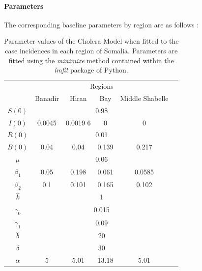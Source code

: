 \documentclass[letter,12pt, usenames,dvipsnames]{article}
\begin{document}
\paragraph{Parameters}
The corresponding baseline parameters by region are as follows :

\begin{table}[h!]
    \centering
    {\footnotesize
    \begin{tabular}{|c||c|c| c| c | c|}
        \hline
         &\multicolumn{4}{c|}{Regions}\\\cline{2-5}
         & Banadir & Hiran & Bay & Middle Shabelle\\\hline\hline
         
         $S(0)$ & \multicolumn{4}{c|}{0.98} \\\hline	 
         
         
        $I(0)$ &0.0045	&  0.0019 6 & 0	 & 0  \\\hline	 
         
        
        $R(0)$ & \multicolumn{4}{c|}{0.01}\\\hline	 
         
        $B(0)$ &0.04&0.04	 & 0.139 & 0.217\\\hline	 
         
    $\mu$&	\multicolumn{4}{c|}{0.06}\\\hline	 
         
    
    $\beta_1$ &	0.05 &0.198	&0.061	&0.0585 \\\hline	 
         
$\beta_2$&	0.1 &0.101 & 0.165& 0.102 \\\hline
    $\hat{k}$ &\multicolumn{4}{c|}{1}\\\hline	 
         
    $\gamma_0$ &\multicolumn{4}{c|}{0.015}\\\hline	 
         
    $\gamma_1$ &\multicolumn{4}{c|}{0.09} \\\hline	 
         
    $\hat{b}$ &\multicolumn{4}{c|}{20}\\\hline	 
         
    $\delta$ &\multicolumn{4}{c|}{30}\\\hline	 
         
    $\alpha$ &5 & 5.01 &  13.18 &5.01\\\hline

        
    \end{tabular}
    }
    \caption{Parameter values of the Cholera Model when fitted to the case incidences in each region of Somalia.  Parameters are fitted using the {\it minimize} method contained within the {\it lmfit} package of Python.} 
    \label{table:choleraModelValues}
\end{table}
\end{document}
